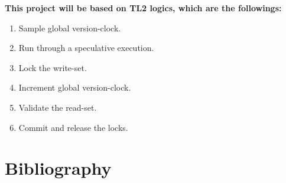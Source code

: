 \documentclass[12pt]{article}
\begin{document}
\textbf{This project will be based on TL2 logics, which are the followings:}
\begin{enumerate}
\item Sample global version-clock.
\item Run through a speculative execution.
\item Lock the write-set.
\item Increment global version-clock.
\item Validate the read-set.
\item Commit and release the locks.
\end{enumerate}



\newpage
\section{Bibliography}
\begin{center}



\end{center}
\end{document}
